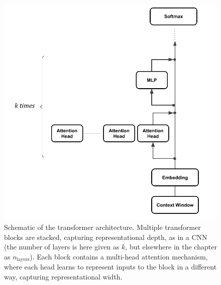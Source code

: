 \begin{figure}[ht]
\centering
\includegraphics[scale=.35]{./images/transformerBlockMultiHeadResidualStream.png}
\caption[Jeff Yoshimi with consultation from Tim Meyer.]{Schematic of the
transformer architecture. Multiple transformer blocks are stacked, capturing
representational depth, as in a CNN (the number of layers is here given as $k$, but elsewhere in the chapter as $n_{\mbox{layers}}$). Each block contains a multi-head attention
mechanism, where each head learns to represent inputs to the block in a
different way, capturing representational width.}
\label{multipleHeads}
\end{figure}
 
